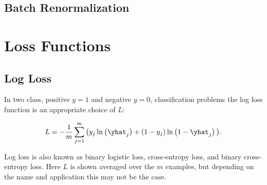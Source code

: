 \subsection{Batch Renormalization}
\label{ml_general:reg:batch_renorm}

\section{Loss Functions}
\label{ml_general:loss_func}


\subsection{Log Loss}
\label{ml_general:loss_func:log_loss}

In two class, positive $y=1$ and negative $y=0$, classification problems
the log loss function is an appropriate choice of $L$:

\begin{equation} \label{eq:log_loss}
L = -\frac{1}{m} \sum_{j=1}^{m} \big(y_{j} \ln\left(\yhat_{j}\right) +\left(1-y_{j}\right) \ln\left(1-\yhat_{j}\right)\big).
\end{equation}

Log loss is also known as binary logistic loss,
cross-entropy loss, and binary cross-entropy loss.
Here $L$ is shown averaged over the $m$ examples,
but depending on the name and application this may not be the case.


